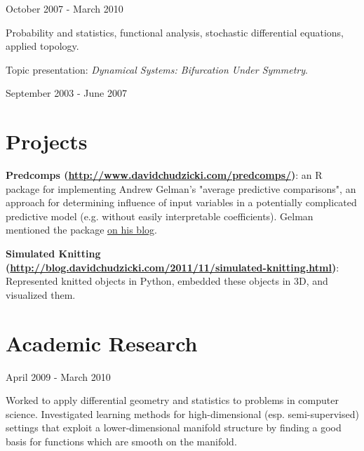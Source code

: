 \documentclass[letterpaper]{resume}
\begin{document}
{October 2007 - March 2010}
{}
{}
\begin{compactitem}
\item Probability and statistics, functional analysis, stochastic differential equations, applied topology.
\item Topic presentation: \textit{Dynamical Systems: Bifurcation Under Symmetry}.      
\end{compactitem}


{September 2003 - June 2007}
{}
{}

\section{Projects}
\begin{compactitem}
\item \textbf{Predcomps (\href{http://www.davidchudzicki.com/predcomps/}{http://www.davidchudzicki.com/predcomps/})}: an R package for implementing Andrew Gelman's "average predictive comparisons", an approach for determining influence of input variables in a potentially complicated predictive model (e.g. without easily interpretable coefficients). Gelman mentioned the package \href{http://andrewgelman.com/2014/06/17/average-predictive-comparisons-r-david-chudzicki-writes-package/}{\underline{on his blog}}.
\end{compactitem}

\begin{compactitem}
\item \textbf{Simulated Knitting (\href{http://blog.davidchudzicki.com/2011/11/simulated-knitting.html}{http://blog.davidchudzicki.com/2011/11/simulated-knitting.html})}: Represented knitted objects in Python, embedded these objects in 3D, and visualized them.
\end{compactitem}

\section{Academic Research}

{April 2009 - March 2010}
{}
{}
\begin{compactitem}
\item Worked to apply differential geometry and 
statistics to problems in computer science. Investigated learning methods for 
high-dimensional (esp. semi-supervised) settings that exploit a lower-dimensional manifold structure by finding a good 
basis for functions which are smooth on the manifold.
\end{compactitem}
\end{document}
